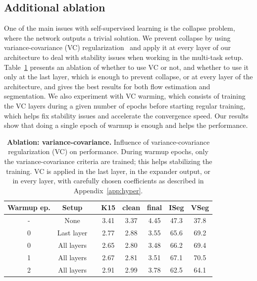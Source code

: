 \subsection{Additional ablation} \label{app:additional_ablation} 

One of the main issues with self-supervised learning is the collapse problem, where the network outputs a trivial solution. We prevent collapse by using variance-covariance (VC) regularization~\cite{bardes2022vicreg} and apply it at every layer of our architecture to deal with stability issues when working in the multi-task setup. Table~\ref{tab:vc} presents an ablation of whether to use VC or not, and whether to use it only at the last layer, which is enough to prevent collapse, or at every layer of the architecture, and gives the best results for both flow estimation and segmentation. We also experiment with VC warming, which consists of training the VC layers during a given number of epochs before starting regular training, which helps fix stability issues and accelerate the convergence speed. Our results show that doing a single epoch of warmup is enough and helps the performance.
\parspace

\begin{table}[t]
\caption{\textbf{Ablation: variance-covariance.} Influence of variance-covariance regularization (VC) on performance. During warmup epochs, only the variance-covariance criteria are trained; this helps stabilizing the training. VC is applied in the last layer, in the expander output, or in every layer, with carefully chosen coefficients as described in Appendix~\ref{app:hyper}.}
\vspace{1mm}
\centering
\small
\setlength{\tabcolsep}{2pt}
\begin{tabular}{@{} cc c ccccc @{}}
\toprule
Warmup ep. & Setup && K15 & clean & final & ISeg & VSeg \\
\midrule
- & None && 3.41 & 3.37 & 4.45 & 47.3 & 37.8 \\
0 & Last layer && 2.77 & 2.88 & 3.55 & 65.6  & 69.2 \\
0 & All layers && 2.65 & 2.80 & 3.48 & 66.2  & 69.4 \\
\rowcolor{cyan!50}
1 & All layers && 2.67 & 2.81 & 3.51 & 67.1  & 70.5 \\
2 & All layers && 2.91 & 2.99 & 3.78 & 62.5  & 64.1 \\
\bottomrule
\end{tabular}
\label{tab:vc}
\end{table}



